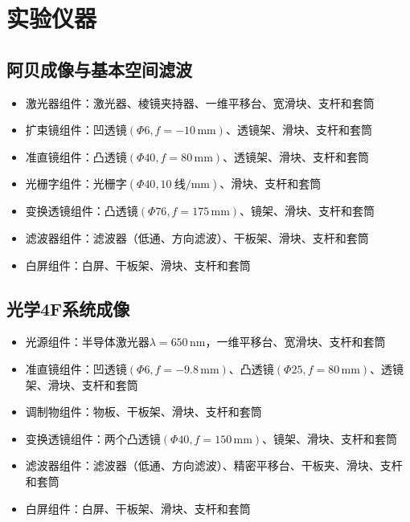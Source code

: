 \documentclass[UTF-8,twoside,cs4size]{ctexart}
\begin{document}
\section{实验仪器}
\subsection{阿贝成像与基本空间滤波}
\begin{itemize}
    \item 激光器组件：激光器、棱镜夹持器、一维平移台、宽滑块、支杆和套筒
    \item 扩束镜组件：凹透镜\(\left( \varPhi 6, f = -10\,\text{mm} \right)\)、透镜架、滑块、支杆和套筒
    \item 准直镜组件：凸透镜\(\left( \varPhi 40, f = 80\,\text{mm} \right)\)、透镜架、滑块、支杆和套筒
    \item 光栅字组件：光栅字\(\left( \varPhi 40, 10\ \text{线}/\text{mm} \right)\)、滑块、支杆和套筒
    \item 变换透镜组件：凸透镜\(\left( \varPhi 76, f = 175\,\text{mm} \right)\)、镜架、滑块、支杆和套筒
    \item 滤波器组件：滤波器（低通、方向滤波）、干板架、滑块、支杆和套筒
    \item 白屏组件：白屏、干板架、滑块、支杆和套筒
\end{itemize}

\subsection{光学4F系统成像}
\begin{itemize}
    \item 光源组件：半导体激光器\(\lambda = 650\,\text{nm}\)，一维平移台、宽滑块、支杆和套筒
    \item 准直镜组件：凹透镜\(\left( \varPhi 6, f = -9.8\,\text{mm} \right)\)、凸透镜\(\left( \varPhi 25, f = 80\,\text{mm} \right)\)、透镜架、滑块、支杆和套筒
    \item 调制物组件：物板、干板架、滑块、支杆和套筒
    \item 变换透镜组件：两个凸透镜\(\left( \varPhi 40, f = 150\,\text{mm} \right)\)、镜架、滑块、支杆和套筒
    \item 滤波器组件：滤波器（低通、方向滤波）、精密平移台、干板夹、滑块、支杆和套筒
    \item 白屏组件：白屏、干板架、滑块、支杆和套筒
\end{itemize}
\end{document}
